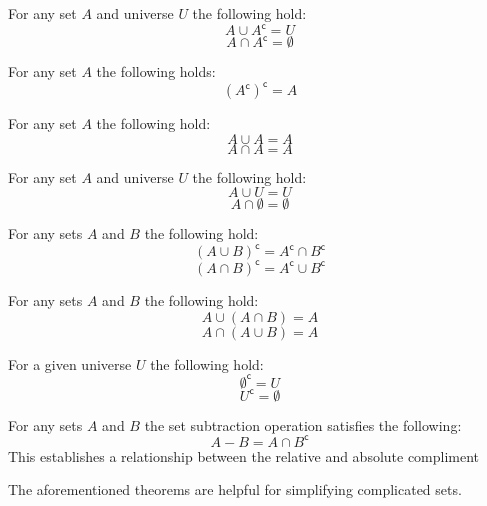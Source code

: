 \documentclass[main.tex]{subfiles}
\begin{document}
\begin{thm}[Inverse]
	For any set \(A\) and universe \(U\) the following hold: \[A \cup A^{\mathsf{c}} = U\] \[A \cap A^{\mathsf{c}} = \emptyset\]
\end{thm}

\begin{thm}
	For any set \(A\) the following holds: \[(A^{\mathsf{c}})^{\mathsf{c}} = A\]
\end{thm}

\begin{thm}[Idempotence]
	For any set \(A\) the following hold: \[A \cup A = A\] \[A \cap A = A\]
\end{thm}

\begin{thm}
	For any set \(A\) and universe \(U\) the following hold: \[A \cup U = U\] \[A \cap \emptyset = \emptyset\]
\end{thm}

\begin{thm}[De Morgan's]
	For any sets \(A\) and \(B\) the following hold: \[(A \cup B)^{\mathsf{c}} = A^{\mathsf{c}} \cap B^{\mathsf{c}}\] \[(A \cap B)^{\mathsf{c}} = A^{\mathsf{c}} \cup B^{\mathsf{c}}\]
\end{thm}

\begin{thm}[Absorption]
	For any sets \(A\) and \(B\) the following hold: \[A \cup (A \cap B) = A\] \[A \cap (A \cup B) = A\]
\end{thm}

\begin{thm}
	For a given universe \(U\) the following hold: \[\emptyset^{\mathsf{c}} = U\] \[U^{\mathsf{c}} = \emptyset\]
\end{thm}

\begin{thm}
	\label{set-sub-eq}
	For any sets \(A\) and \(B\) the set subtraction operation satisfies the following: \[A - B = A \cap B^{\mathsf{c}}\]
	This establishes a relationship between the relative and absolute compliment
\end{thm}

The aforementioned theorems are helpful for simplifying complicated sets.

\end{document}

